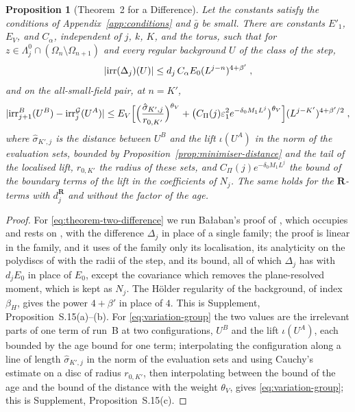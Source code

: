 \documentclass[11pt]{preprint}
\DeclarePairedDelimiter{\abs}{\lvert}{\rvert}
\numberwithin{equation}{section}
\newtheorem{proposition}[theorem]{Proposition}
\theoremstyle{definition}
\theoremstyle{remark}
\theoremstyle{plain}
\begin{document}
\begin{proposition}[Theorem~2 for a Difference]\label{prop:theorem-two-difference}
Let the constants satisfy the conditions of Appendix~\ref{app:conditions} and $\bar g$ be small. There are constants $E'_1$, $E_V$, and $C_\alpha$, independent of $j$, $k$, $K$, and the torus, such that for $z \in \Lambda^0_j \cap (\Omega_n \setminus \Omega_{n+1})$ and every regular background $U$ of the class of the step,
\begin{equation}\label{eq:theorem-two-difference}
    \abs{\mathrm{irr}(\Delta_j)(U)} \leq d_j\,C_\alpha E_0(L^{j-n})^{4+\beta'}\;,
\end{equation}
and on the all-small-field pair, at $n = K'$,
\begin{equation}\label{eq:variation-group}
    \abs{\mathrm{irr}^B_{j+1}(U^B) - \mathrm{irr}^{\mathcal G}_j(U^A)} \leq E_V\Bigl[\Bigl(\frac{\hat\sigma_{K',j}}{r_{0,K'}}\Bigr)^{\theta_V} + \bigl(C_\Pi(j)\varepsilon_1^2e^{-\delta_0M_1L^j}\bigr)^{\theta_V}\Bigr](L^{j-K'})^{4+\beta'/2}\;,
\end{equation}
where $\hat\sigma_{K',j}$ is the distance between $U^B$ and the lift $\iota(U^A)$ in the norm of the evaluation sets, bounded by Proposition~\ref{prop:minimiser-distance} and the tail of the localised lift, $r_{0,K'}$ the radius of these sets, and $C_\Pi(j)e^{-\delta_0M_1L^j}$ the bound of the boundary terms of the lift in the coefficients of $N_j$. The same holds for the $\mathbf R$-terms with $d^{\mathbf R}_j$ and without the factor of the age.
\end{proposition}

\begin{proof}
For \eqref{eq:theorem-two-difference} we run Ba{\l}aban's proof of \cite[Theorem~2, (2.43)]{BalabanCRE}, which occupies \cite[pp.~279--283]{BalabanCRE} and rests on \cite[Sects.~3--4]{BalabanRG1}, with the difference $\Delta_j$ in place of a single family; the proof is linear in the family, and it uses of the family only its localisation, its analyticity on the polydiscs of \cite[(3.13)--(3.14)]{BalabanRG1} with the radii of the step, and its bound, all of which $\Delta_j$ has with $d_jE_0$ in place of $E_0$, except the covariance which removes the plane-resolved moment, which is kept as $N_j$. The H\"older regularity of the background, of index $\beta_H$, gives the power $4 + \beta'$ in place of $4$. This is Supplement, Proposition~S.15(a)--(b). For \eqref{eq:variation-group} the two values are the irrelevant parts of one term of run~B at two configurations, $U^B$ and the lift $\iota(U^A)$, each bounded by the age bound for one term; interpolating the configuration along a line of length $\hat\sigma_{K',j}$ in the norm of the evaluation sets and using Cauchy's estimate on a disc of radius $r_{0,K'}$, then interpolating between the bound of the age and the bound of the distance with the weight $\theta_V$, gives \eqref{eq:variation-group}; this is Supplement, Proposition~S.15(c).
\end{proof}
\end{document}
